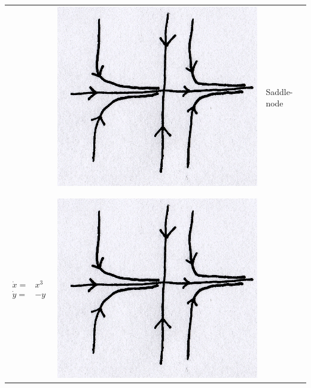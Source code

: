 \documentclass{article}
\begin{document}
\begin{enumerate}[(a)]
\begin{center}
\begin{tabular}{ m{3cm} m{3cm} m{3cm}  }
& \includegraphics[scale=0.1]{fig15.png}
& Saddle-node \\ 
\\
\\
$\begin{array}{lr}
 \dot{x} = & x^3 \\
 \dot{y} = & -y \end{array}$
& \includegraphics[scale=0.1]{fig15.png}

\end{tabular}
\end{center}
\end{enumerate}
\end{document}
